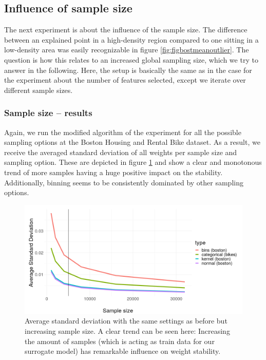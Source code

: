 \documentclass[]{krantz}
\begin{document}
\subsection{Influence of sample size}\label{influence-of-sample-size}

The next experiment is about the influence of the sample size. The
difference between an explained point in a high-density region compared
to one sitting in a low-density area was easily recognizable in figure
\ref{fig:figbostmeanoutlier}. The question is how this relates to an
increased global sampling size, which we try to answer in the following.
Here, the setup is basically the same as in the case for the experiment
about the number of features selected, except we iterate over different
sample sizes.

\subsubsection{Sample size -- results}\label{sample-size-results}

Again, we run the modified algorithm of the experiment for all the
possible sampling options at the Boston Housing and Rental Bike dataset.
As a result, we receive the averaged standard deviation of all weights
per sample size and sampling option. These are depicted in figure
\ref{fig:fignperm} and show a clear and monotonous trend of more samples
having a huge positive impact on the stability. Additionally, binning
seems to be consistently dominated by other sampling options.

\begin{figure}

{\centering \includegraphics[width=0.99\linewidth]{images/sd_npermutations_presi2} 

}

\caption{Average standard deviation with the same settings as before but increasing sample size. A clear trend can be seen here: Increasing the amount of samples (which is acting as train data for our surrogate model) has remarkable influence on weight stability.}\label{fig:fignperm}
\end{figure}
\end{document}
